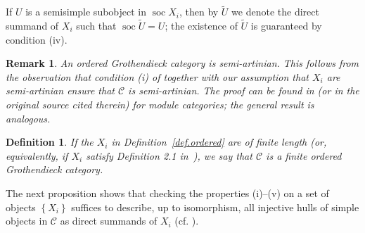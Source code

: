 \documentclass[11pt]{article}
\theoremstyle{plain}
\theoremstyle{nonumberplain}
\theoremstyle{plain}
\newtheorem{definition}[lemma]{Definition}
\newtheorem{remark}[lemma]{Remark}
\theoremstyle{nonumberplain}
\newcommand\cC{\mathcal C}
\newcommand\cS{\mathcal S}
\DeclareMathOperator{\soc}{\mathrm{soc}}
\begin{document}
If $U$ is a semisimple subobject in $\soc X_i$, then by $\widetilde{U}$ we
denote the direct summand of $X_i$ such that $\soc \widetilde{U}=U$;
the existence of $\widetilde{U}$ is guaranteed by condition (iv).

%


\begin{remark}\label{re.is-sa}
  An ordered Grothendieck category is semi-artinian.  This follows
  from the observation that condition (i) of 
  together with our assumption that $X_i$ are semi-artinian ensure
  that $\cC$ is semi-artinian.
  The proof can be found in \cite[41.10 (4)]{BW} (or in the original
  source \cite[27.5, 32.5]{W} cited therein) for module categories;
  the general result is analogous.
\end{remark}



\begin{definition}
  If the $X_i$ in Definition~\ref{def.ordered} are of finite length
  (or, equivalently, if $X_i$ satisfy Definition 2.1 in~\cite{us2}), we
  say that $\mathcal{C}$ is a \emph{finite ordered Grothendieck
    category}.
\label{def.finordgroth}
\end{definition}



The next proposition shows that checking the properties (i)--(v) on a
set of objects $\left\{X_i\right\}$ suffices to describe, up to
isomorphism, all injective hulls of simple objects in $\mathcal{C}$ as
direct summands of $X_i$ (cf. \cite[Proposition 2.3]{us2}).
\end{document}
